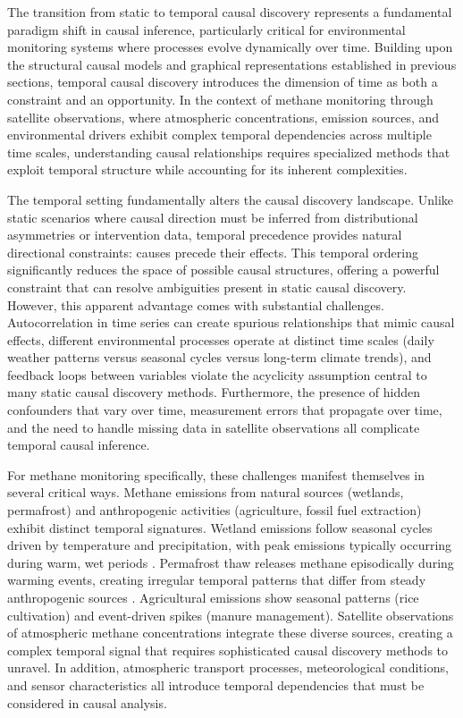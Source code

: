 The transition from static to temporal causal discovery represents a fundamental paradigm shift in causal inference, particularly critical for environmental monitoring systems where processes evolve dynamically over time. Building upon the structural causal models and graphical representations established in previous sections, temporal causal discovery introduces the dimension of time as both a constraint and an opportunity. In the context of methane monitoring through satellite observations, where atmospheric concentrations, emission sources, and environmental drivers exhibit complex temporal dependencies across multiple time scales, understanding causal relationships requires specialized methods that exploit temporal structure while accounting for its inherent complexities.

The temporal setting fundamentally alters the causal discovery landscape. Unlike static scenarios where causal direction must be inferred from distributional asymmetries or intervention data, temporal precedence provides natural directional constraints: causes precede their effects. This temporal ordering significantly reduces the space of possible causal structures, offering a powerful constraint that can resolve ambiguities present in static causal discovery. However, this apparent advantage comes with substantial challenges. Autocorrelation in time series can create spurious relationships that mimic causal effects, different environmental processes operate at distinct time scales (daily weather patterns versus seasonal cycles versus long-term climate trends), and feedback loops between variables violate the acyclicity assumption central to many static causal discovery methods. Furthermore, the presence of hidden confounders that vary over time, measurement errors that propagate over time, and the need to handle missing data in satellite observations all complicate temporal causal inference.

For methane monitoring specifically, these challenges manifest themselves in several critical ways. Methane emissions from natural sources (wetlands, permafrost) and anthropogenic activities (agriculture, fossil fuel extraction) exhibit distinct temporal signatures. Wetland emissions follow seasonal cycles driven by temperature and precipitation, with peak emissions typically occurring during warm, wet periods \cite{Pandey2017}. Permafrost thaw releases methane episodically during warming events, creating irregular temporal patterns that differ from steady anthropogenic sources \cite{Knox2024}. Agricultural emissions show seasonal patterns (rice cultivation) and event-driven spikes (manure management). Satellite observations of atmospheric methane concentrations integrate these diverse sources, creating a complex temporal signal that requires sophisticated causal discovery methods to unravel. In addition, atmospheric transport processes, meteorological conditions, and sensor characteristics all introduce temporal dependencies that must be considered in causal analysis.

